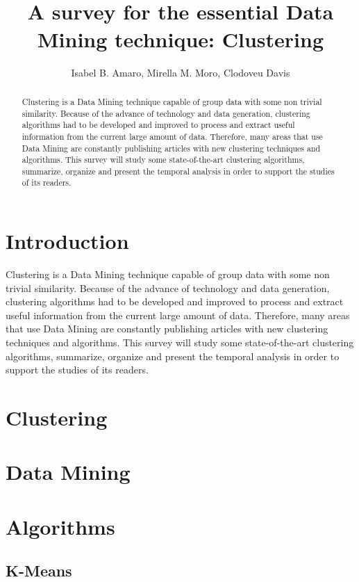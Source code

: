 \documentclass[12pt]{article}
\title{\\ A survey for the essential Data Mining technique: Clustering}
\author{Isabel B. Amaro\inst{1}, Mirella M. Moro\inst{2}, Clodoveu Davis\inst{3}}
\begin{document}
 

\maketitle

\begin{abstract}
Clustering is a Data Mining technique capable of group data with some non trivial similarity. Because of the advance of technology and data generation, clustering algorithms had to be developed and improved to process and extract useful information from the current large amount of data. Therefore, many areas that use Data Mining are constantly publishing articles with new clustering techniques and algorithms. This survey will study some state-of-the-art clustering algorithms, summarize, organize and present the temporal analysis in order to support the studies of its readers.
\end{abstract}

\section{Introduction}
Clustering is a Data Mining technique capable of group data with some non trivial similarity. Because of the advance of technology and data generation, clustering algorithms had to be developed and improved to process and extract useful information from the current large amount of data. Therefore, many areas that use Data Mining are constantly publishing articles with new clustering techniques and algorithms. This survey will study some state-of-the-art clustering algorithms, summarize, organize and present the temporal analysis in order to support the studies of its readers.

\section{Clustering}

\section{Data Mining}

\section{Algorithms}

\subsection{K-Means}
\end{document}
